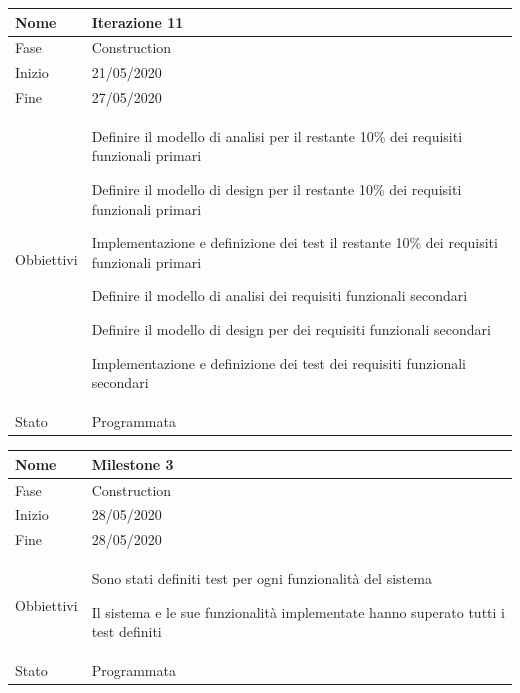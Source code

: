 \begin{center}
\begin{tabular}{ |p{2cm}|p{10cm}|  }
\hline
Nome & Iterazione 11 \\\hline
Fase & Construction \\\hline
Inizio & 21/05/2020 \\\hline
Fine &  27/05/2020  \\\hline
Obbiettivi & 
	\begin{compactitem}
		\item Definire il modello di analisi per il restante 10\% dei requisiti funzionali primari
		\item Definire il modello di design per il restante 10\% dei requisiti funzionali primari
		\item Implementazione e definizione dei test il restante 10\% dei requisiti funzionali primari
		
		\item Definire il modello di analisi dei requisiti funzionali secondari
		\item Definire il modello di design per dei requisiti funzionali secondari
		\item Implementazione e definizione dei test dei requisiti funzionali secondari
		
	\end{compactitem}\\\hline
Stato &  Programmata \\\hline
\end{tabular}
\label{table:11}\newline


\begin{tabular}{ |p{2cm}|p{10cm}|  }
\hline
Nome & Milestone 3\\\hline
Fase & Construction \\\hline
Inizio & 28/05/2020 \\\hline
Fine &  28/05/2020 \\\hline
Obbiettivi & 
	\begin{compactitem}
		\item Sono stati definiti test per ogni funzionalità del sistema
		\item Il sistema e le sue funzionalità implementate hanno superato tutti i test definiti
	\end{compactitem}\\\hline
Stato &  Programmata \\\hline
\end{tabular}
\label{table:milestone3}\newline


\end{center}
